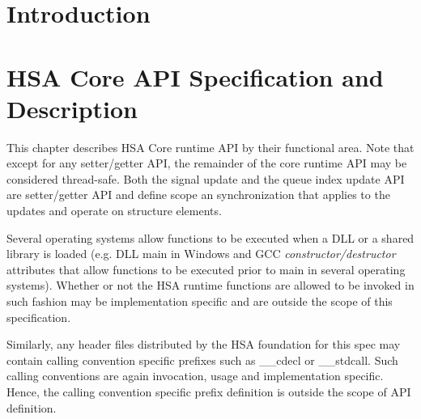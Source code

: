 \documentclass{book}
\begin{document}
%

\hypersetup{pageanchor=true,citecolor=blue}
\chapter{Introduction} \label{index}\hypertarget{index}{}


\chapter{HSA Core A\-P\-I Specification and Description} \label{coreapi}
\hypertarget{coreapi}{}
This chapter describes HSA Core runtime API by their functional
area. Note that except for any setter/getter API, the remainder of
the core runtime API may be considered thread-safe.  Both the signal
update and the queue index update API are setter/getter API and
define scope an synchronization that applies to the updates and
operate on structure elements.

Several operating systems allow functions to be executed when a DLL
or a shared library is loaded (e.g. DLL main in Windows and GCC
\emph{constructor/destructor} attributes that allow functions to be
executed prior to main in several operating systems). 
Whether or not the HSA runtime functions are allowed to be invoked
in such fashion may be implementation specific and are outside the
scope of this specification.

Similarly, any header files distributed by the HSA foundation for
this spec may contain calling convention specific prefixes such as
\_\_cdecl or \_\_stdcall. Such calling conventions are again invocation,
usage and implementation specific. Hence, the calling convention
specific prefix definition is outside the scope of API definition. 


\end{document}
